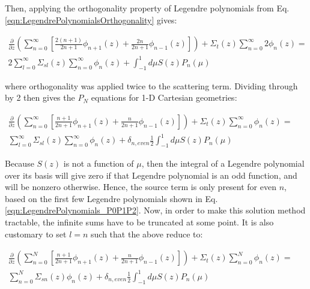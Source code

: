 \documentclass[10pt]{article}
\begin{document}
\begin{flushleft}
Then, applying the orthogonality property of Legendre polynomials from Eq. \eqref{eqn:LegendrePolynomialsOrthogonality} gives:

  \begin{equation}
\label{eq:PNStep4}
\begin{aligned}
\frac{\partial}{\partial z}\left(\sum_{n=0}^{\infty}\left\lbrack\frac{2(n+1)}{2n+1}\phi_{n+1}(z) +\frac{2n}{2n+1} \phi_{n-1}(z)\right\rbrack\right) + \Sigma_t(z)\sum_{n=0}^{\infty}2\phi_n(z) =\quad\quad\\
2\sum_{l=0}^{\infty}\Sigma_{sl}(z)\sum_{n=0}^{\infty}\phi_n(z) + \int_{-1}^{1}d\mu S(z)P_n(\mu)
 \end{aligned}
 \end{equation}

where orthogonality was applied twice to the scattering term. Dividing through by 2 then gives the \(P_N\) equations for 1-D Cartesian geometries:

\begin{equation}
\label{eq:PNStep5}
\begin{aligned}
\frac{\partial}{\partial z}\left(\sum_{n=0}^{\infty}\left\lbrack\frac{n+1}{2n+1}\phi_{n+1}(z) +\frac{n}{2n+1} \phi_{n-1}(z)\right\rbrack\right) + \Sigma_t(z)\sum_{n=0}^{\infty}\phi_n(z) =\quad\quad\\
\sum_{l=0}^{\infty}\Sigma_{sl}(z)\sum_{n=0}^{\infty}\phi_n(z) + \delta_{n,even}\frac{1}{2}\int_{-1}^{1}d\mu S(z)P_n(\mu)
 \end{aligned}
 \end{equation}

Because \(S(z)\) is not a function of \(\mu\), then the integral of a Legendre polynomial over its basis will give zero if that Legendre polynomial is an odd function, and will be nonzero otherwise. Hence, the source term is only present for even \(n\), based on the first few Legendre polynomials shown in Eq. \eqref{eqn:LegendrePolynomials_P0P1P2}. Now, in order to make this solution method tractable, the infinite sums have to be truncated at some point. It is also customary to set \(l=n\) such that the above reduce to:

\begin{equation}
\label{eq:PNStep6}
\begin{aligned}
\frac{\partial}{\partial z}\left(\sum_{n=0}^{N}\left\lbrack\frac{n+1}{2n+1}\phi_{n+1}(z) +\frac{n}{2n+1} \phi_{n-1}(z)\right\rbrack\right) + \Sigma_t(z)\sum_{n=0}^{N}\phi_n(z) =\quad\quad\\
\sum_{n=0}^{N}\Sigma_{sn}(z)\phi_n(z) +  \delta_{n,even}\frac{1}{2}\int_{-1}^{1}d\mu S(z)P_n(\mu)
 \end{aligned}
 \end{equation}


\end{flushleft}
\end{document}
